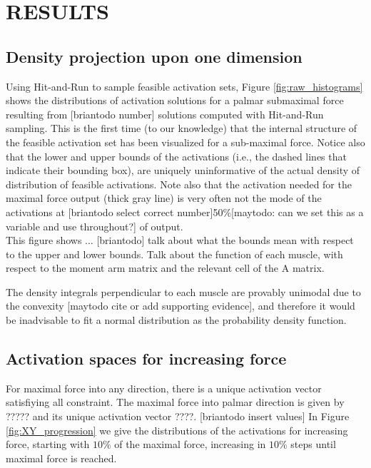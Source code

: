 

\section{RESULTS}
\subsection{Density projection upon one dimension} %
\label{ssub:density_projection_upon_one_dimension}

Using Hit-and-Run to sample feasible activation sets, Figure \ref{fig:raw_histograms} shows the distributions of activation solutions for a palmar submaximal force resulting from [briantodo number] solutions computed with Hit-and-Run sampling. This is the first time (to our knowledge) that the internal structure of the feasible activation set has been visualized for a sub-maximal force.
Notice also that the lower and upper bounds of the activations (i.e., the dashed lines that indicate their bounding box), are uniquely uninformative of the actual density of distribution of feasible activations. Note also that the activation needed for the maximal force output (thick gray line) is very often not the mode of the activations at [briantodo select correct number]50\%[maytodo: can we set this as a variable and use throughout?] of output.
\\
This figure shows ... [briantodo]
talk about what the bounds mean with respect to the upper and lower bounds.
Talk about the function of each muscle, with respect to the moment arm matrix and the relevant cell of the A matrix.

The density integrals perpendicular to each muscle are provably unimodal due to the convexity [maytodo cite or add supporting evidence], and therefore it would be inadvisable to fit a normal distribution as the probability density function.


\subsection{Activation spaces for increasing force} %
\label{sub:activation_spaces_for_increasing_force}
For maximal force into any direction, there is a unique activation vector satisfiying all constraint. The maximal force into palmar direction is given by ????? and its unique activation vector ????. [briantodo insert values]
In Figure \ref{fig:XY_progression} we give the distributions of the activations for increasing force, starting with $10\%$ of the maximal force, increasing in $10\%$ steps until maximal force is reached.

